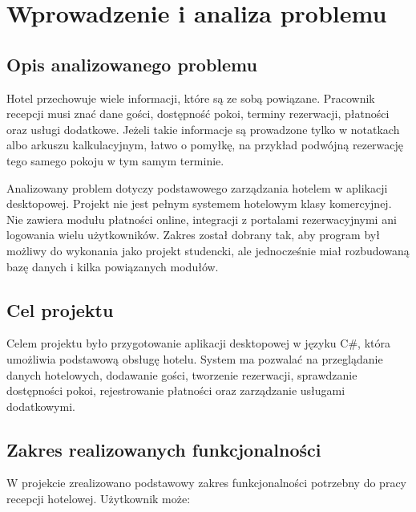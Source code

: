 \chapter{Wprowadzenie i analiza problemu}

\section{Opis analizowanego problemu}

Hotel przechowuje wiele informacji, które są ze sobą powiązane. Pracownik recepcji musi znać dane gości, dostępność pokoi, terminy rezerwacji, płatności oraz usługi dodatkowe. Jeżeli takie informacje są prowadzone tylko w notatkach albo arkuszu kalkulacyjnym, łatwo o pomyłkę, na przykład podwójną rezerwację tego samego pokoju w tym samym terminie.

Analizowany problem dotyczy podstawowego zarządzania hotelem w aplikacji desktopowej. Projekt nie jest pełnym systemem hotelowym klasy komercyjnej. Nie zawiera modułu płatności online, integracji z portalami rezerwacyjnymi ani logowania wielu użytkowników. Zakres został dobrany tak, aby program był możliwy do wykonania jako projekt studencki, ale jednocześnie miał rozbudowaną bazę danych i kilka powiązanych modułów.

\section{Cel projektu}

Celem projektu było przygotowanie aplikacji desktopowej w języku C\#, która umożliwia podstawową obsługę hotelu. System ma pozwalać na przeglądanie danych hotelowych, dodawanie gości, tworzenie rezerwacji, sprawdzanie dostępności pokoi, rejestrowanie płatności oraz zarządzanie usługami dodatkowymi.

\section{Zakres realizowanych funkcjonalności}

W projekcie zrealizowano podstawowy zakres funkcjonalności potrzebny do pracy recepcji hotelowej. Użytkownik może:

